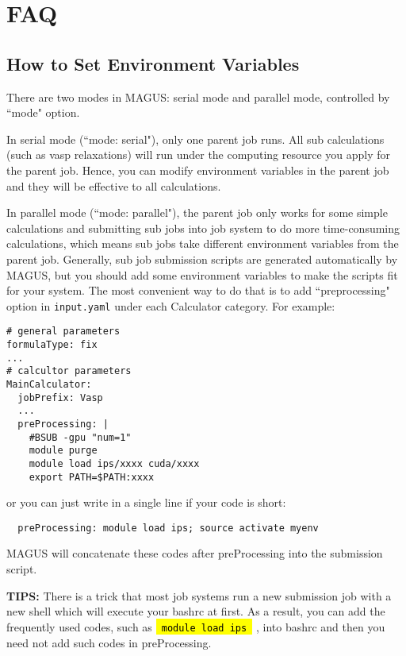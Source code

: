 \documentclass[12pt,oneside]{book}
\newcommand{\code}[1]{
  \begingroup
  \sethlcolor{Seashell}
  {\hl{\texttt{~#1~}}}
  \endgroup
}
\newcommand{\file}[1]{\texttt{#1}}
\begin{document}
\chapter{FAQ}
\section{How to Set Environment Variables}\label{sec: preprocessing}
There are two modes in MAGUS: serial mode and parallel mode, controlled by ``mode" option.

In serial mode (``mode: serial"), only one parent job runs. All sub calculations (such as vasp relaxations) will run under the computing resource you apply for the parent job. Hence, you can modify environment variables in the parent job and they will be effective to all calculations.

In parallel mode (``mode: parallel"), the parent job only works for some simple calculations and submitting sub jobs into job system to do more time-consuming calculations, which means sub jobs take different environment variables from the parent job. Generally, sub job submission scripts are generated automatically by MAGUS, but you should add some environment variables to make the scripts fit for your system. The most convenient way to do that is to add ``preprocessing" option in \file{input.yaml} under each Calculator category. For example:
\begin{tcolorbox}
    \begin{verbatim}
# general parameters
formulaType: fix
...
# calcultor parameters
MainCalculator:
  jobPrefix: Vasp
  ...
  preProcessing: |
    #BSUB -gpu "num=1"
    module purge
    module load ips/xxxx cuda/xxxx
    export PATH=$PATH:xxxx
    \end{verbatim}
\end{tcolorbox}
or you can just write in a single line if your code is short:
\begin{tcolorbox}
    \begin{verbatim}
  preProcessing: module load ips; source activate myenv
    \end{verbatim}
\end{tcolorbox}
MAGUS will concatenate these codes after preProcessing into the submission script.

\textbf{TIPS:} There is a trick that most job systems run a new submission job with a new shell which will execute your bashrc at first. As a result, you can add the frequently used codes, such as \code{module load ips}, into bashrc and then you need not add such codes in preProcessing.
\end{document}
